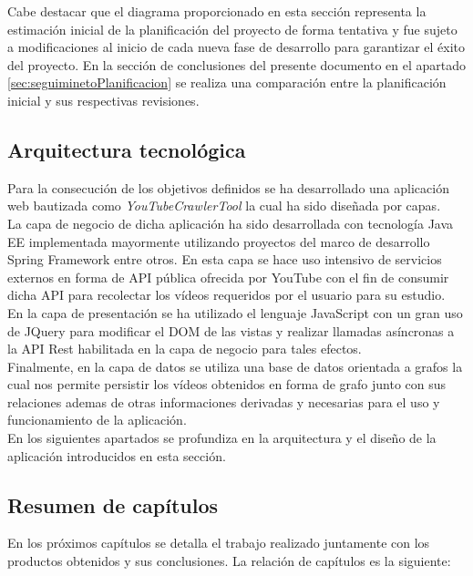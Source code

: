 \documentclass[11pt,a4paper]{article}
\begin{document}
Cabe destacar que el diagrama proporcionado en esta sección representa la estimación inicial de la planificación del proyecto de forma tentativa y fue sujeto a modificaciones al inicio de cada nueva fase de desarrollo para garantizar el éxito del proyecto. En la sección de conclusiones del presente documento en el apartado \ref{sec:seguiminetoPlanificacion} se realiza una comparación entre la planificación inicial y sus respectivas revisiones.
\newpage


\subsection{Arquitectura tecnológica}
Para la consecución de los objetivos definidos se ha desarrollado una aplicación web bautizada como \textit{YouTubeCrawlerTool} la cual ha sido diseñada por capas.
\\

La capa de negocio de dicha aplicación ha sido desarrollada con tecnología Java EE \cite{10} implementada mayormente utilizando proyectos del marco de desarrollo Spring Framework \cite{11} entre otros. En esta capa se hace uso intensivo de servicios externos en forma de API pública ofrecida por YouTube con el fin de consumir dicha API para recolectar los vídeos requeridos por el usuario para su estudio.
\\

En la capa de presentación se ha utilizado el lenguaje JavaScript \cite{12} con un gran uso de JQuery \cite{13} para modificar el DOM de las vistas y realizar llamadas asíncronas a la API Rest habilitada en la capa de negocio para tales efectos.
\\

Finalmente, en la capa de datos se utiliza una base de datos orientada a grafos \cite{14} la cual nos permite persistir los vídeos obtenidos en forma de grafo junto con sus relaciones ademas de otras informaciones derivadas y necesarias para el uso y funcionamiento de la aplicación.
\\

En los siguientes apartados se profundiza en la arquitectura y el diseño de la aplicación introducidos en esta sección.
\medskip 

\subsection{Resumen de capítulos}
En los próximos capítulos se detalla el trabajo realizado juntamente con los productos obtenidos y sus conclusiones. La relación de capítulos es la siguiente:
\end{document}
